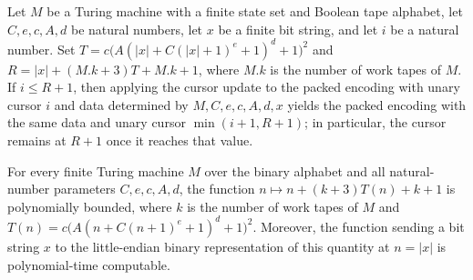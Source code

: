 \begin{lemma}
\label{Complexity.clA5Next_pack}
\leanok
{}
Let $M$ be a Turing machine with a finite state set and Boolean tape alphabet, let
$C,e,c,A,d$ be natural numbers, let $x$ be a finite bit string, and let $i$ be a natural
number. Set $T=c\bigl(A(|x|+C(|x|+1)^e+1)^d+1\bigr)^2$ and $R=|x|+(M.k+3)T+M.k+1$, where
$M.k$ is the number of work tapes of $M$. If $i\le R+1$, then applying the cursor update
to the packed encoding with unary cursor $i$ and data determined by $M,C,e,c,A,d,x$
yields the packed encoding with the same data and unary cursor $\min(i+1,R+1)$; in
particular, the cursor remains at $R+1$ once it reaches that value.
\end{lemma}

\begin{lemma}
\label{Complexity.clA5Fuel}
\leanok
{}
For every finite Turing machine $M$ over the binary alphabet and all natural-number
parameters $C,e,c,A,d$, the function $n\mapsto n+(k+3)T(n)+k+1$ is polynomially bounded,
where $k$ is the number of work tapes of $M$ and
$T(n)=c\bigl(A(n+C(n+1)^e+1)^d+1\bigr)^2$. Moreover, the function sending a bit string
$x$ to the little-endian binary representation of this quantity at $n=|x|$ is
polynomial-time computable.
\end{lemma}

